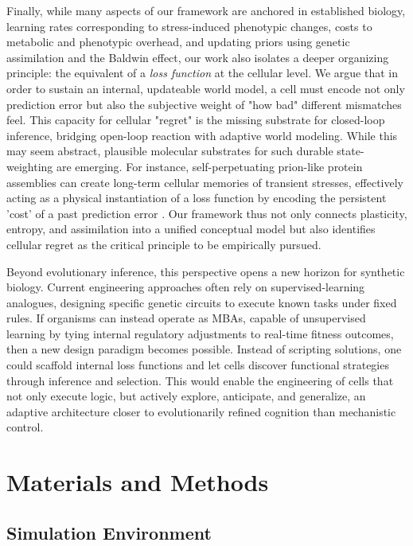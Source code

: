 \documentclass[aps,pre,twocolumn,floatfix,nofootinbib,amsmath,amssymb]{revtex4-2}
\begin{document}
Finally, while many aspects of our framework are anchored in established biology, learning rates corresponding to stress-induced phenotypic changes, costs to metabolic and phenotypic overhead, and updating priors using genetic assimilation and the Baldwin effect, our work also isolates a deeper organizing principle: the equivalent of a \emph{loss function} at the cellular level. We argue that in order to sustain an internal, updateable world model, a cell must encode not only prediction error but also the subjective weight of "how bad" different mismatches feel. This capacity for cellular "regret" is the missing substrate for closed-loop inference, bridging open-loop reaction with adaptive world modeling. While this may seem abstract, plausible molecular substrates for such durable state-weighting are emerging. For instance, self-perpetuating prion-like protein assemblies can create long-term cellular memories of transient stresses, effectively acting as a physical instantiation of a loss function by encoding the persistent 'cost' of a past prediction error \citep{jakobson_metabolites_2021}. Our framework thus not only connects plasticity, entropy, and assimilation into a unified conceptual model but also identifies cellular regret as the critical principle to be empirically pursued.

Beyond evolutionary inference, this perspective opens a new horizon for synthetic biology. Current engineering approaches often rely on supervised-learning analogues, designing specific genetic circuits to execute known tasks under fixed rules. If organisms can instead operate as MBAs, capable of unsupervised learning by tying internal regulatory adjustments to real-time fitness outcomes, then a new design paradigm becomes possible. Instead of scripting solutions, one could scaffold internal loss functions and let cells discover functional strategies through inference and selection. This would enable the engineering of cells that not only execute logic, but actively explore, anticipate, and generalize, an adaptive architecture closer to evolutionarily refined cognition than mechanistic control.


\section{Materials and Methods}

\subsection{Simulation Environment}
\end{document}
